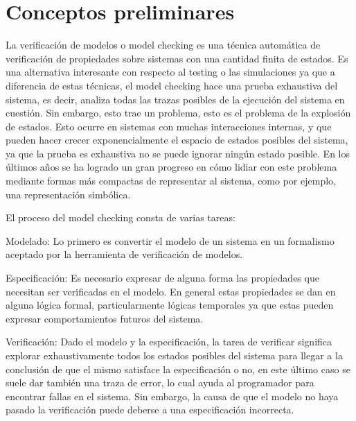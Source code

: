 \chapter{Conceptos preliminares}

La verificación de modelos o model checking es una técnica automática de verificación de propiedades sobre sistemas con una cantidad finita de estados. Es una alternativa interesante con respecto al testing o las simulaciones ya que a diferencia de estas técnicas, el model checking hace una prueba exhaustiva del sistema, es decir, analiza todas las trazas posibles de la ejecución del sistema en cuestión. Sin embargo, esto trae un problema, esto es el problema de la explosión de estados. Esto ocurre en sistemas con muchas interacciones internas, y que pueden hacer crecer exponencialmente el espacio de estados posibles del sistema, ya que la prueba es exhaustiva no se puede ignorar ningún estado posible.
En los últimos años se ha logrado un gran progreso en cómo lidiar con este problema mediante formas más compactas de representar al sistema, como por ejemplo, una representación simbólica.

El proceso del model checking consta de varias tareas:

Modelado: Lo primero es convertir el modelo de un sistema en un formalismo aceptado por la herramienta de verificación de modelos.

Especificación: Es necesario expresar de alguna forma las propiedades que necesitan ser verificadas en el modelo. En general estas propiedades se dan en alguna lógica formal, particularmente lógicas temporales ya que estas pueden expresar comportamientos futuros del sistema.

Verificación: Dado el modelo y la especificación, la tarea de verificar significa explorar exhaustivamente todos los estados posibles del sistema para llegar a la conclusión de que el mismo satisface la especificación o no, en este último caso se suele dar también una traza de error, lo cual ayuda al programador para encontrar fallas en el sistema. Sin embargo, la causa de que el modelo no haya pasado la verificación puede deberse a una especificación incorrecta.



